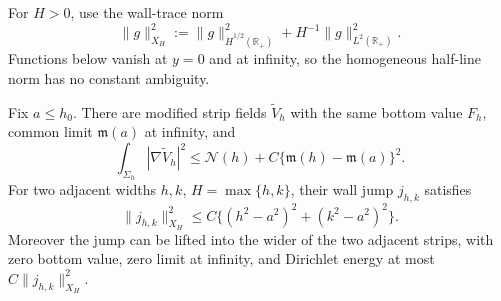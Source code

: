 For \(H>0\), use the wall-trace norm
\begin{equation}\label{F129:eq:XH}
 \|g\|_{X_H}^2
 :=\|g\|_{\dot H^{1/2}(\mathbb R_+)}^2
   +H^{-1}\|g\|_{L^2(\mathbb R_+)}^2.
\end{equation}
Functions below vanish at \(y=0\) and at infinity, so the homogeneous
half-line norm has no constant ambiguity.

\begin{lemma}\label{F129:lem:wall}
Fix \(a\le h_0\).  There are modified strip fields
\(\widetilde V_h\) with the same bottom value \(F_h\), common limit
\(\mathfrak m(a)\) at infinity, and
\begin{equation}\label{F129:eq:modified-energy}
 \int_{\Sigma_h}|\nabla\widetilde V_h|^2
 \le\mathcal N(h)+C\{\mathfrak m(h)-\mathfrak m(a)\}^2.
\end{equation}
For two adjacent widths \(h,k\), \(H=\max\{h,k\}\), their wall jump
\(j_{h,k}\) satisfies
\begin{equation}\label{F129:eq:jump}
 \|j_{h,k}\|_{X_H}^2
 \le C\{(h^2-a^2)^2+(k^2-a^2)^2\}.
\end{equation}
Moreover the jump can be lifted into the wider of the two adjacent strips,
with zero bottom value, zero limit at infinity, and Dirichlet energy at
most \(C\|j_{h,k}\|_{X_H}^2\).
\end{lemma}

